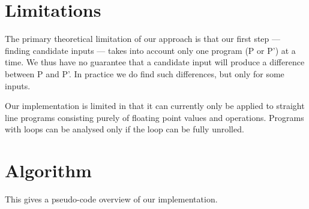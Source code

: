 \documentclass{article}
\begin{document}
\section{Limitations}

The primary theoretical limitation of our approach is that our first step —
finding candidate inputs — takes into account only one program (P or P') at a
time. We thus have no guarantee that a candidate input will produce a difference
between P and P'. In practice we do find such differences, but only for some
inputs.

Our implementation is limited in that it can currently only be applied to
straight line programs consisting purely of floating point values and
operations. Programs with loops can be analysed only if the loop can be fully
unrolled.

\section{Algorithm}

This gives a pseudo-code overview of our implementation.
\end{document}
